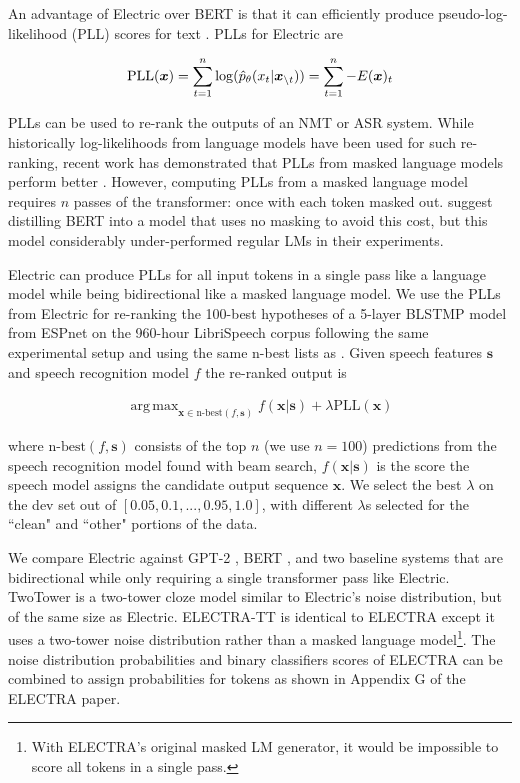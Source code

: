 \documentclass[11pt,a4paper]{article}
\newcommand{\alns}[1] {
	\begin{align*} #1 \end{align*}
}
\newcommand{\bx}{\bm{x}}
\newcommand{\cntxt}{\bx_{\backslash t}}
\newcommand{\up}{\hat{p}_\theta}
\newcommand{\bs} {\bm{s}}
\DeclareMathOperator*{\argmax}{arg\,max}
\begin{document}
An advantage of Electric over BERT is that it can efficiently produce pseudo-log-likelihood (PLL) scores for text \cite{Wang2019BERTHA}. PLLs for Electric are
\vspace{-1mm}
\alns{
    \text{PLL}(\bx) 
    = \sum_{t=1}^n \log(\up(x_t | \cntxt)) 
    = \sum_{t=1}^n -E(\bx)_t \vspace{-1mm}
}
PLLs can be used to re-rank the outputs of an NMT or ASR system.
While historically log-likelihoods from language models have been used for such re-ranking, recent work has demonstrated that PLLs from masked language models perform better \cite{shin2019effective}. 
However, computing PLLs from a masked language model requires $n$ passes of the transformer: once with each token masked out.
\citet{Salazar2019MaskedLM} suggest distilling BERT into a model that uses no masking to avoid this cost, but this model considerably under-performed regular LMs in their experiments.

Electric can produce PLLs for all input tokens in a single pass like a language model while being bidirectional like a masked language model.
We use the PLLs from Electric for re-ranking the 100-best hypotheses of a 5-layer BLSTMP model 
from ESPnet \citep{Watanabe2018ESPnetES} on the 960-hour LibriSpeech corpus \citep{Panayotov2015LibrispeechAA} following the same experimental setup and using the same n-best lists as \citet{Salazar2019MaskedLM}.
Given speech features $\bs$ and speech recognition model $f$ the re-ranked output is
\alns{
   \argmax_{\bx \in \text{n-best}(f, \bs)}  f(\bx|\bs) + \lambda \text{PLL}(\bx)
}
where $\text{n-best}(f, \bs)$ consists of the top $n$ (we use $n=100$) predictions from the speech recognition model found with beam search, $f(\bx|\bs)$ is the score the speech model assigns the candidate output sequence $\bx$.
We select the best $\lambda$ on the dev set out of $[0.05, 0.1, ..., 0.95, 1.0]$, with different $\lambda$s selected for the ``clean" and ``other" portions of the data.

We compare Electric against GPT-2 \citep{Radford2019LanguageMA}, BERT \citep{devlin2018bert}, and two baseline systems that are bidirectional while only requiring a single transformer pass like Electric. TwoTower is a two-tower cloze model similar to Electric's noise distribution, but of the same size as Electric.
ELECTRA-TT is identical to ELECTRA except it uses a two-tower noise distribution rather than a masked language model\footnote{With ELECTRA's original masked LM generator, it would be impossible to score all tokens in a single pass. }. The noise distribution probabilities and binary classifiers scores of ELECTRA can be combined to assign probabilities for tokens as shown in Appendix G of the ELECTRA paper.
\end{document}
